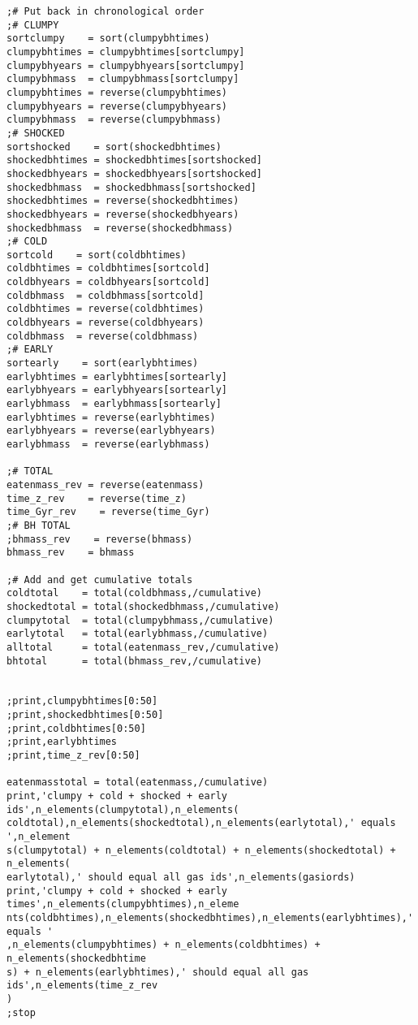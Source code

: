 \documentclass[12pt,headA,chapB]{fiskthesis}
\begin{document}
\begin{verbatim}
;# Put back in chronological order
;# CLUMPY
sortclumpy    = sort(clumpybhtimes)
clumpybhtimes = clumpybhtimes[sortclumpy]
clumpybhyears = clumpybhyears[sortclumpy]
clumpybhmass  = clumpybhmass[sortclumpy]
clumpybhtimes = reverse(clumpybhtimes)
clumpybhyears = reverse(clumpybhyears)
clumpybhmass  = reverse(clumpybhmass)
;# SHOCKED
sortshocked    = sort(shockedbhtimes)
shockedbhtimes = shockedbhtimes[sortshocked]
shockedbhyears = shockedbhyears[sortshocked]
shockedbhmass  = shockedbhmass[sortshocked]
shockedbhtimes = reverse(shockedbhtimes)
shockedbhyears = reverse(shockedbhyears)
shockedbhmass  = reverse(shockedbhmass)
;# COLD
sortcold    = sort(coldbhtimes)
coldbhtimes = coldbhtimes[sortcold]
coldbhyears = coldbhyears[sortcold]
coldbhmass  = coldbhmass[sortcold]
coldbhtimes = reverse(coldbhtimes)
coldbhyears = reverse(coldbhyears)
coldbhmass  = reverse(coldbhmass)
;# EARLY
sortearly    = sort(earlybhtimes)
earlybhtimes = earlybhtimes[sortearly]
earlybhyears = earlybhyears[sortearly]
earlybhmass  = earlybhmass[sortearly]
earlybhtimes = reverse(earlybhtimes)
earlybhyears = reverse(earlybhyears)
earlybhmass  = reverse(earlybhmass)

;# TOTAL
eatenmass_rev = reverse(eatenmass)
time_z_rev    = reverse(time_z)
time_Gyr_rev    = reverse(time_Gyr)
;# BH TOTAL
;bhmass_rev    = reverse(bhmass)
bhmass_rev    = bhmass

;# Add and get cumulative totals
coldtotal    = total(coldbhmass,/cumulative)
shockedtotal = total(shockedbhmass,/cumulative)
clumpytotal  = total(clumpybhmass,/cumulative)
earlytotal   = total(earlybhmass,/cumulative)
alltotal     = total(eatenmass_rev,/cumulative)
bhtotal      = total(bhmass_rev,/cumulative)


;print,clumpybhtimes[0:50]
;print,shockedbhtimes[0:50]
;print,coldbhtimes[0:50]
;print,earlybhtimes
;print,time_z_rev[0:50]

eatenmasstotal = total(eatenmass,/cumulative)
print,'clumpy + cold + shocked + early ids',n_elements(clumpytotal),n_elements(
coldtotal),n_elements(shockedtotal),n_elements(earlytotal),' equals ',n_element
s(clumpytotal) + n_elements(coldtotal) + n_elements(shockedtotal) + n_elements(
earlytotal),' should equal all gas ids',n_elements(gasiords)
print,'clumpy + cold + shocked + early times',n_elements(clumpybhtimes),n_eleme
nts(coldbhtimes),n_elements(shockedbhtimes),n_elements(earlybhtimes),' equals '
,n_elements(clumpybhtimes) + n_elements(coldbhtimes) + n_elements(shockedbhtime
s) + n_elements(earlybhtimes),' should equal all gas ids',n_elements(time_z_rev
)
;stop



\end{verbatim}
\end{document}
